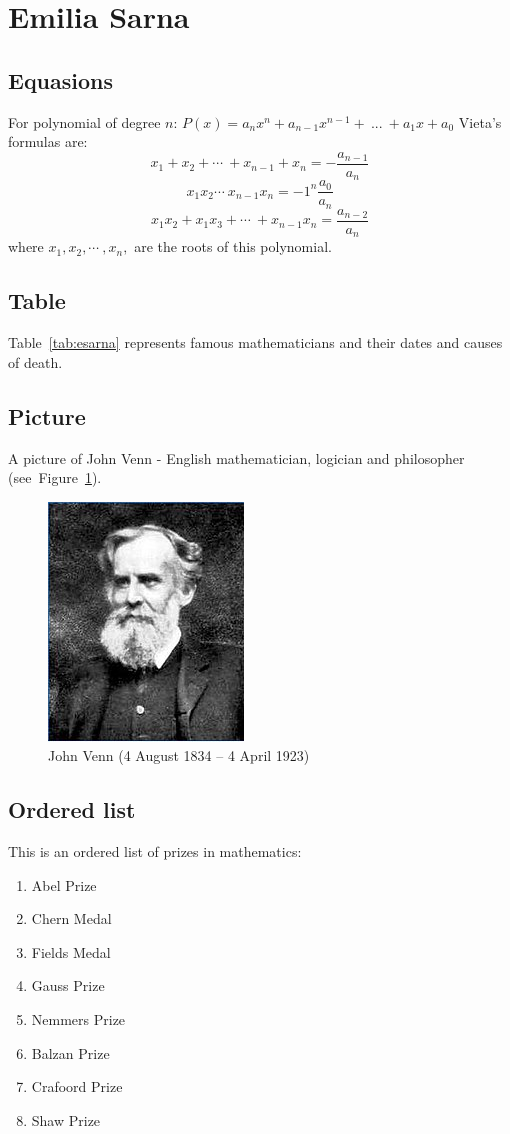 \section{Emilia Sarna}

\subsection{Equasions}
For polynomial of degree $n$: $P(x) = a_{n}x^{n}+a_{n-1}x^{n-1}+\>...\>+a_{1}x+a_{0}$
 Vieta's formulas are: 
\[x_{1}+x_{2}+\cdots\>+x_{n-1}+x_{n}=-\frac{a_{n-1}}{a_{n}}\] 
\[x_{1}x_{2}\cdots\>x_{n-1}x_{n}=-1^{n}\frac{a_{0}}{a_{n}}\]
\[x_{1}x_{2}+x_{1}x_{3}+\cdots\>+x_{n-1}x_{n}=\frac{a_{n-2}}{a_{n}}\]
where $x_{1},x_{2},\cdots\>,x_{n},$ are the roots of this polynomial.

\subsection{Table}
Table~\ref{tab:esarna} represents famous mathematicians and their dates and causes of death.


\newpage
\subsection{Picture}
A picture of John Venn - English mathematician, logician and philosopher (see~Figure~\ref{fig:Venn}).
\begin{figure}[htbp]
    \centering
    \includegraphics[scale=0.5]{pictures/JVenn.jpg}
    \caption{John Venn (4 August 1834 – 4 April 1923)}
    \label{fig:Venn}
\end{figure}


\subsection{Ordered list}
This is an ordered list of prizes in mathematics:
\begin{enumerate}
    \item Abel Prize
    \item Chern Medal
    \item Fields Medal
    \item Gauss Prize
    \item Nemmers Prize
    \item Balzan Prize
    \item Crafoord Prize
    \item Shaw Prize
\end{enumerate}

